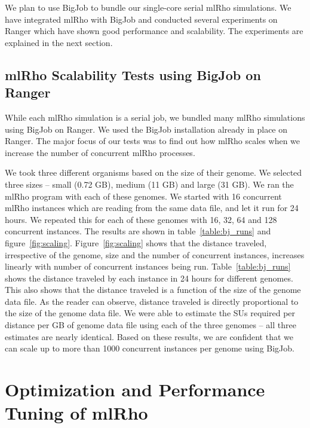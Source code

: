 \documentclass{sig-alternate}
\begin{document}
We plan to use BigJob to bundle our single-core serial mlRho simulations. We have integrated mlRho with BigJob and conducted several experiments on Ranger which have shown good performance and scalability. The experiments are explained in the next section. 


\subsection{mlRho Scalability Tests using BigJob on Ranger }
\label{sec:tests}

While each mlRho simulation is a serial job, we bundled many mlRho simulations using BigJob on Ranger. 
We used the BigJob installation already in place on Ranger. The major focus of our tests was to find out how mlRho scales when we increase the number of concurrent mlRho processes. 

We took three different organisms based on the size of their genome. We selected three sizes -- small (0.72 GB), medium (11 GB) and large (31 GB). We ran the mlRho program with each of these genomes. We started with 16 concurrent mlRho instances which are reading from the same data file, and let it run for 24 hours. We repeated this for each of these genomes with 16, 32, 64 and 128 concurrent instances. The results are shown in table~\ref{table:bj_runs} and figure~\ref{fig:scaling}.
Figure~\ref{fig:scaling} shows that the distance traveled, irrespective of the genome, size and the number of concurrent instances, increases linearly with number of concurrent instances being run. Table~\ref{table:bj_runs} shows the distance traveled by each instance in 24 hours for different genomes. This also shows that the distance traveled is a function of the size of the genome data file. As the reader can observe, distance traveled is directly proportional to the size of the genome data file. We were able to estimate the SUs required per distance per GB of genome data file using each of the three genomes -- all three estimates are nearly identical. Based on these results, we are confident that we can scale up to more than 1000 concurrent instances per genome using BigJob.




\section{Optimization and Performance Tuning of mlRho}\label{sec:optimization}
\end{document}
